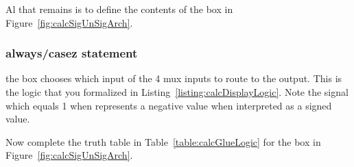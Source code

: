 Al that remains is to define the contents of the  box in Figure~\ref{fig:calcSigUnSigArch}. 

\subsubsection{ always/casez statement}

the  box chooses which input of the 4 mux inputs to
route to the output. This is the logic that you formalized in 
Listing~\ref{listing:calcDisplayLogic}.  Note the signal  which equals 1 when 
 represents a negative value when interpreted as a signed value.
 
 Now complete the truth table in Table~\ref{table:calcGlueLogic} for the  box
in Figure~\ref{fig:calcSigUnSigArch}. 


